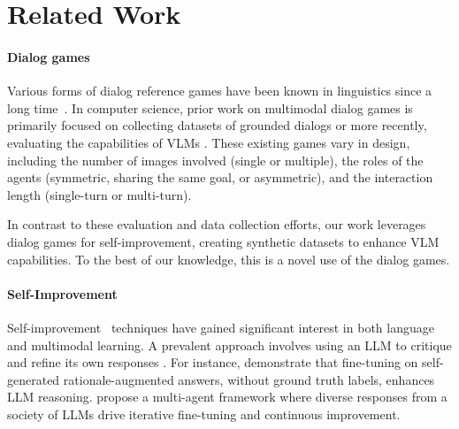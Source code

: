 \section{Related Work}
\label{sec:relwork}

\paragraph{Dialog games}

Various forms of dialog reference games have been known in linguistics since a long time~\citep{krauss1964changes}.
In computer science, prior work on multimodal dialog games is primarily focused on collecting datasets of grounded dialogs \citep{haber2019photobook, das2017visual, de2017guesswhat} or more recently, evaluating the capabilities of VLMs \citep{hakimov2024usinggameplayinvestigate, chalamalasetti2023clembench}.  
These existing games vary in design, including the number of images involved (single or multiple), the roles of the agents (symmetric, sharing the same goal, or asymmetric), and the interaction length (single-turn or multi-turn).

In contrast to these evaluation and data collection efforts, our work leverages dialog games for self-improvement, creating synthetic datasets to enhance VLM capabilities.
To the best of our knowledge, this is a novel use of the dialog games.

\paragraph{Self-Improvement}

Self-improvement~\citep{chen2024selfplay} techniques have gained significant interest in both language and multimodal learning.
A prevalent approach involves using an LLM to critique and refine its own responses \citep{bai2022constitutional, yuan2024selfrewarding}.
For instance, \citet{huang2022large} demonstrate that fine-tuning on self-generated rationale-augmented answers, without ground truth labels, enhances LLM reasoning. 
\citet{subramaniam2025multiagent} propose a multi-agent framework where diverse responses from a society of LLMs drive iterative fine-tuning and continuous improvement.

